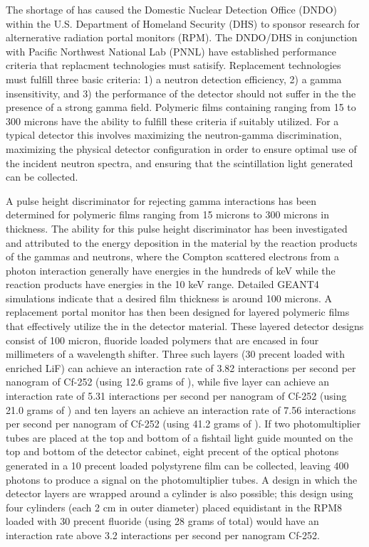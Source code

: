 The shortage of  has caused the Domestic Nuclear Detection Office (DNDO) within the U.S. Department of Homeland Security (DHS) to sponsor research for alternerative radiation portal monitors (RPM).
The DNDO/DHS in conjunction with Pacific Northwest National Lab (PNNL) have established performance criteria that replacment technologies must satisify.
Replacement technologies must fulfill three basic criteria: 1) a neutron detection efficiency, 2) a gamma insensitivity, and 3) the performance of the detector should not suffer in the the presence of a strong gamma field.
Polymeric films containing  ranging from 15 to 300 microns have the ability to fulfill these criteria if suitably utilized.
For a typical detector this involves maximizing the neutron-gamma discrimination, maximizing the physical detector configuration in order to ensure optimal use of the incident neutron spectra, and ensuring that the scintillation light generated can be collected.

A pulse height discriminator for rejecting gamma interactions has been determined for polymeric films ranging from 15 microns to 300 microns in thickness. 
The ability for this pulse height discriminator has been investigated and attributed to the energy deposition in the material by the reaction products of the gammas and neutrons, where the Compton scattered electrons from a photon interaction generally have energies in the hundreds of keV while the  reaction products have energies in the 10 keV range. 
Detailed GEANT4 simulations indicate that a desired film thickness is around 100 microns. 
A replacement portal monitor has then been designed for layered polymeric films that effectively utilize the  in the detector material. 
These layered detector designs consist of 100 micron,  fluoride loaded polymers that are encased in four millimeters of a wavelength shifter. 
Three such layers (30 precent loaded with enriched LiF) can achieve an interaction rate of 3.82 interactions per second per nanogram of Cf-252 (using 12.6 grams of ), while five layer can achieve an interaction rate of 5.31 interactions per second per nanogram of Cf-252 (using 21.0 grams of ) and ten layers an achieve an interaction rate of 7.56 interactions per second per nanogram of Cf-252 (using 41.2 grams of ). 
If two photomultiplier tubes are placed at the top and bottom of a fishtail light guide mounted on the top and bottom of the detector cabinet, eight precent of the optical photons generated in a 10 precent loaded polystyrene film can be collected, leaving 400 photons to produce a signal on the photomultiplier tubes. A design in which the  detector layers are wrapped around a cylinder is also possible; this design using four cylinders (each 2 cm in outer diameter) placed equidistant in the RPM8 loaded with 30 precent  fluoride (using 28 grams of  total) would have an interaction rate above 3.2 interactions per second per nanogram Cf-252.
